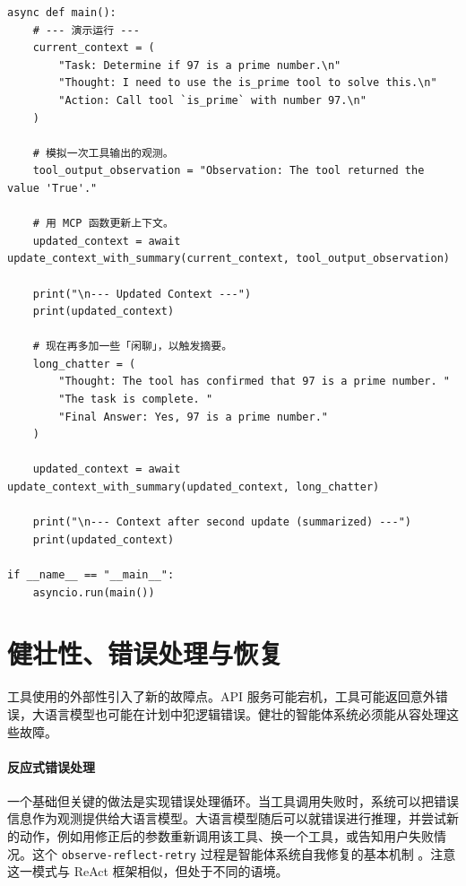 \begin{listing}
\begin{verbatim}
async def main():
    # --- 演示运行 ---
    current_context = (
        "Task: Determine if 97 is a prime number.\n"
        "Thought: I need to use the is_prime tool to solve this.\n"
        "Action: Call tool `is_prime` with number 97.\n"
    )

    # 模拟一次工具输出的观测。
    tool_output_observation = "Observation: The tool returned the value 'True'."

    # 用 MCP 函数更新上下文。
    updated_context = await update_context_with_summary(current_context, tool_output_observation)

    print("\n--- Updated Context ---")
    print(updated_context)

    # 现在再多加一些「闲聊」，以触发摘要。
    long_chatter = (
        "Thought: The tool has confirmed that 97 is a prime number. "
        "The task is complete. "
        "Final Answer: Yes, 97 is a prime number."
    )

    updated_context = await update_context_with_summary(updated_context, long_chatter)

    print("\n--- Context after second update (summarized) ---")
    print(updated_context)

if __name__ == "__main__":
    asyncio.run(main())
\end{verbatim}
    \caption{模型上下文协议的简化实现（第 2 部分）。}\label{lst:MCP2}
\end{listing}



\section{健壮性、错误处理与恢复}
工具使用的外部性引入了新的故障点。API 服务可能宕机，工具可能返回意外错误，大语言模型也可能在计划中犯逻辑错误。健壮的智能体系统必须能从容处理这些故障。

\paragraph{反应式错误处理}
一个基础但关键的做法是实现错误处理循环。当工具调用失败时，系统可以把错误信息作为观测提供给大语言模型。大语言模型随后可以就错误进行推理，并尝试新的动作，例如用修正后的参数重新调用该工具、换一个工具，或告知用户失败情况。这个 \texttt{observe-reflect-retry} 过程是智能体系统自我修复的基本机制 \citep{sun2024llmruntimeerrorhandler}。注意这一模式与 ReAct 框架相似，但处于不同的语境。

